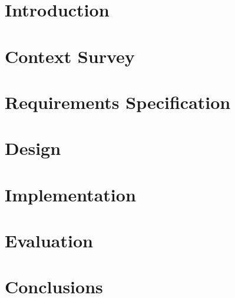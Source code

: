 \documentclass[12pt]{report}
\begin{document}

\tableofcontents

\chapter{Introduction}


\chapter{Context Survey}


\chapter{Requirements Specification}




\chapter{Design}


\chapter{Implementation}


\chapter{Evaluation}


\chapter{Conclusions}

\end{document}
